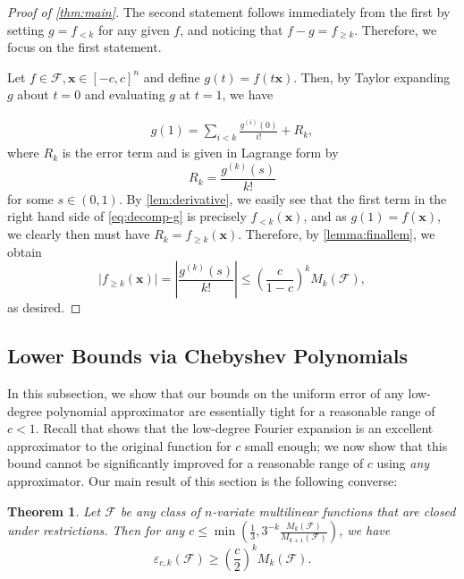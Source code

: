 \documentclass[10pt,a4paper]{article}
\newcommand{\eps}{\varepsilon}
\newtheorem{THM}[theorem]{Theorem}
\theoremstyle{definition}
\begin{document}
    \begin{proof}[Proof of \cref{thm:main}]
    The second statement follows immediately from the first by setting $g=f_{<k}$ for any given $f$, and noticing that $f-g=f_{\geq k}$. Therefore, we focus on the first statement.
    
Let $f\in \mathcal{F}, \mathbf{x}\in [-c,c]^n$ and define $g(t)=f(t\mathbf{x})$. Then, by Taylor expanding $g$ about $t=0$ and evaluating $g$ at $t=1$, we have

\begin{align} \label{eq:decomp-g}
    g(1)=\sum_{i<k} \frac{g^{(i)}(0)}{i!} +R_k, 
\end{align}
where $R_k$ is the error term and is given in Lagrange form by
\begin{equation*}
    R_k = \frac{g^{(k)}(s)}{k!}
\end{equation*}
for some $s\in (0,1)$. By \cref{lem:derivative}, we easily see that the first term in the right hand side of \cref{eq:decomp-g} is precisely $f_{<k}(\mathbf{x})$, and as $g(1)=f(\mathbf{x})$, we clearly then must have $R_k = f_{\geq k}(\mathbf{x})$.  Therefore, by \cref{lemma:finallem}, we obtain
\begin{equation*}
    \vert f_{\geq k}(\mathbf{x})\vert = \left\vert\frac{g^{(k)}(s)}{k!}\right\vert \leq \left(\frac{c}{1-c}\right)^k M_k(\mathcal{F}),
\end{equation*}
as desired.
\end{proof}


\subsection{Lower Bounds via Chebyshev Polynomials}

In this subsection, we show that our bounds on the uniform error of any low-degree polynomial approximator are essentially tight for a reasonable range of $c<1$. Recall that  shows that the low-degree Fourier expansion is an excellent approximator to the original function for $c$ small enough; we now show that this bound cannot be significantly improved for a reasonable range of $c$ using \emph{any} approximator. Our main result of this section is the following converse:

\begin{THM}
\label{thm:cheby}
Let $\mathcal{F}$ be any class of $n$-variate multilinear functions that are closed under restrictions.  Then for any $c\leq \min\left(\frac{1}{3}, 3^{-k} \frac{M_k(\mathcal{F})}{M_{k+1}(\mathcal{F})}\right)$, we have
\begin{equation*}
    \eps_{c,k}(\mathcal{F}) \geq \left(\frac{c}{2}\right)^k M_k(\mathcal{F}).
\end{equation*}
\end{THM}
\end{document}
